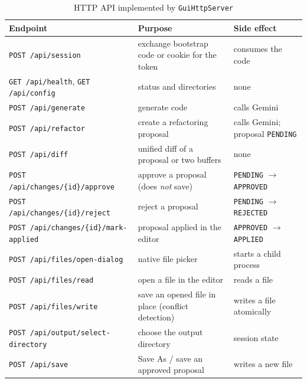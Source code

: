 \documentclass[12pt,a4paper,oneside]{book}
\begin{document}
\begin{table}[htbp]
\centering\scriptsize
\begin{tabular}{|p{4.6cm}|p{4.6cm}|p{4.6cm}|}
\hline
\textbf{Endpoint} & \textbf{Purpose} & \textbf{Side effect} \\ \hline
\texttt{POST /\allowbreak{}api/\allowbreak{}session} & exchange bootstrap code or cookie for the token & consumes the code \\ \hline
\texttt{GET /\allowbreak{}api/\allowbreak{}health}, \texttt{GET /\allowbreak{}api/\allowbreak{}config} & status and directories & none \\ \hline
\texttt{POST /\allowbreak{}api/\allowbreak{}generate} & generate code & calls Gemini \\ \hline
\texttt{POST /\allowbreak{}api/\allowbreak{}refactor} & create a refactoring proposal & calls Gemini; proposal \texttt{PENDING} \\ \hline
\texttt{POST /\allowbreak{}api/\allowbreak{}diff} & unified diff of a proposal or two buffers & none \\ \hline
\texttt{POST /\allowbreak{}api/\allowbreak{}changes/\allowbreak{}\{id\}/\allowbreak{}approve} & approve a proposal (does \emph{not} save) & \texttt{PENDING} $\rightarrow$ \texttt{APPROVED} \\ \hline
\texttt{POST /\allowbreak{}api/\allowbreak{}changes/\allowbreak{}\{id\}/\allowbreak{}reject} & reject a proposal & \texttt{PENDING} $\rightarrow$ \texttt{REJECTED} \\ \hline
\texttt{POST /\allowbreak{}api/\allowbreak{}changes/\allowbreak{}\{id\}/\allowbreak{}mark-applied} & proposal applied in the editor & \texttt{APPROVED} $\rightarrow$ \texttt{APPLIED} \\ \hline
\texttt{POST /\allowbreak{}api/\allowbreak{}files/\allowbreak{}open-dialog} & native file picker & starts a child process \\ \hline
\texttt{POST /\allowbreak{}api/\allowbreak{}files/\allowbreak{}read} & open a file in the editor & reads a file \\ \hline
\texttt{POST /\allowbreak{}api/\allowbreak{}files/\allowbreak{}write} & save an opened file in place (conflict detection) & writes a file atomically \\ \hline
\texttt{POST /\allowbreak{}api/\allowbreak{}output/\allowbreak{}select-directory} & choose the output directory & session state \\ \hline
\texttt{POST /\allowbreak{}api/\allowbreak{}save} & Save As / save an approved proposal & writes a new file \\ \hline
\end{tabular}
\caption{HTTP API implemented by \texttt{GuiHttpServer}}
\label{tab:ca-api}
\end{table}
\end{document}
